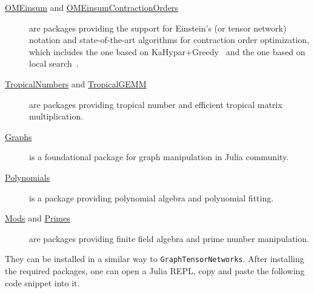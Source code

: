 \documentclass[onefignum, onetabnum]{siamart190516}
\newcommand{\<}{\langle}
\renewcommand{\>}{\rangle}
\begin{document}
\begin{description}
	\item[\href{https://github.com/under-Peter/OMEinsum.jl}{OMEinsum} and \href{https://github.com/Happy-Diode/OMEinsumContractionOrders.jl}{OMEinsumContractionOrders}] are packages providing the support for Einstein's (or tensor network) notation and state-of-the-art algorithms for contraction order optimization, which includes the one based on KaHypar+Greedy~\cite{Gray2021, Pan2021} and the one based on local search~\cite{Kalachev2021}.
	\item[\href{https://github.com/TensorBFS/TropicalNumbers.jl}{TropicalNumbers} and \href{https://github.com/TensorBFS/TropicalGEMM.jl}{TropicalGEMM}] are packages providing tropical number and efficient tropical matrix multiplication.
	\item[\href{https://github.com/JuliaGraphs/Graphs.jl}{Graphs}] is a foundational package for graph manipulation in Julia community.
	\item[\href{https://github.com/JuliaMath/Polynomials.jl}{Polynomials}] is a package providing polynomial algebra and polynomial fitting.
	\item[\href{https://github.com/scheinerman/Mods.jl}{Mods} and \href{https://github.com/JuliaMath/Primes.jl}{Primes}] are packages providing finite field algebra and prime number manipulation.
\end{description}

They can be installed in a similar way to \texttt{GraphTensorNetworks}.
After installing the required packages, one can open a Julia REPL, copy and paste the following code snippet into it.


\end{document}
